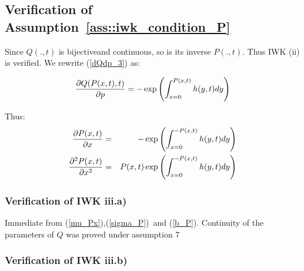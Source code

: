 \documentclass{article}
\begin{document}

\subsection{Verification of Assumption~\ref{ass::iwk_condition_P}}

Since $Q(.,t)$ is bijectiveand continuous, so is its inverse $P(.,t)$. Thus
IWK (ii) is verified. We rewrite (\ref{dQdp_3}) as:

\begin{equation*}
\frac{\partial Q(P(x,t),t)}{\partial p}=-\exp \left( {%
\int_{x=0}^{P(x,t)}h(y,t)dy}\right)
\end{equation*}

Thus:%
\begin{eqnarray}
\frac{\partial P(x,t)}{\partial x} &=&-\exp \left( {%
\int_{x=0}^{-P(x,t)}h(y,t)dy}\right)   \label{dPdx} \\
\frac{\partial ^{2}P(x,t)}{\partial x^{2}} &=&P(x,t)\exp \left( {%
\int_{x=0}^{-P(x,t)}h(y,t)dy}\right)   \label{dPdx_square}
\end{eqnarray}

\subsubsection{Verification of IWK iii.a) }

Immediate from (\ref{mu_Px}),(\ref{sigma_P})\ and (\ref{b_P}). Continuity of
the parameters of $Q$ was proved under assumption 7

\bigskip

\subsubsection{Verification of IWK iii.b)}
\end{document}
